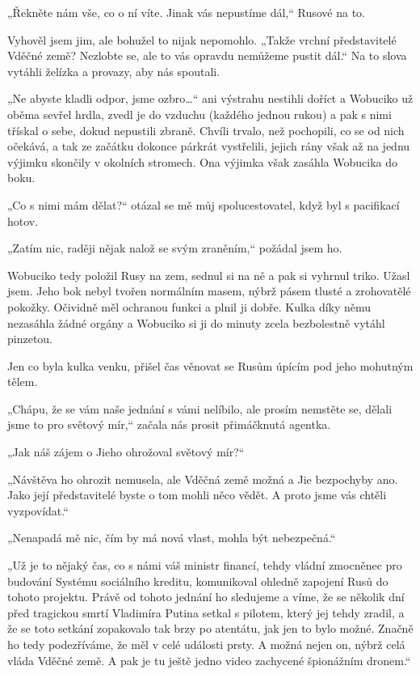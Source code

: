 „Řekněte nám vše, co o ní víte. Jinak vás nepustíme dál,“ Rusové na to.

Vyhověl jsem jim, ale bohužel to nijak nepomohlo. „Takže vrchní představitelé Vděčné země? Nezlobte se, ale to vás opravdu nemůžeme pustit dál.“ Na to slova vytáhli želízka a provazy, aby nás spoutali.

„Ne abyste kladli odpor, jsme ozbro…“ ani výstrahu nestihli doříct a Wobuciko už oběma sevřel hrdla, zvedl je do vzduchu (každého jednou rukou) a pak s nimi třískal o sebe, dokud nepustili zbraně. Chvíli trvalo, než pochopili, co se od nich očekává, a tak ze začátku dokonce párkrát vystřelili, jejich rány však až na jednu výjimku skončily v okolních stromech. Ona výjimka však zasáhla Wobucika do boku.

„Co s nimi mám dělat?“ otázal se mě můj spolucestovatel, když byl s pacifikací hotov.

„Zatím nic, raději nějak nalož se svým zraněním,“ požádal jsem ho.

Wobuciko tedy položil Rusy na zem, sednul si na ně a pak si vyhrnul triko. Užasl jsem. Jeho bok nebyl tvořen normálním masem, nýbrž pásem tlusté a zrohovatělé pokožky. Očividně měl ochranou funkci a plnil ji dobře. Kulka díky němu nezasáhla žádné orgány a Wobuciko si ji do minuty zcela bezbolestně vytáhl pinzetou.  

Jen co byla kulka venku, přišel čas věnovat se Rusům úpícím pod jeho mohutným tělem.

„Chápu, že se vám naše jednání s vámi nelíbilo, ale prosím nemstěte se, dělali jsme to pro světový mír,“ začala nás prosit přimáčknutá agentka.

„Jak náš zájem o Jieho ohrožoval světový mír?“

„Návštěva ho ohrozit nemusela, ale Vděčná země možná a Jie bezpochyby ano. Jako její představitelé byste o tom mohli něco vědět. A proto jsme vás chtěli vyzpovídat.“

„Nenapadá mě nic, čím by má nová vlast, mohla být nebezpečná.“

„Už je to nějaký čas, co s námi váš ministr financí, tehdy vládní zmocněnec pro budování Systému sociálního kreditu, komunikoval ohledně zapojení Rusů do tohoto projektu. Právě od tohoto jednání ho sledujeme a víme, že se několik dní před tragickou smrtí Vladimíra Putina setkal s pilotem, který jej tehdy zradil, a že se toto setkání zopakovalo tak brzy po atentátu, jak jen to bylo možné. Značně ho tedy podezříváme, že měl v celé události prsty. A možná nejen on, nýbrž celá vláda Vděčné země. A pak je tu ještě jedno video zachycené špionážním dronem.“

